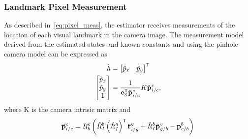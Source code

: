 \subsubsection{Landmark Pixel Measurement}
As described in~\eqref{eq:pixel_meas}, the estimator receives measurements of
the location of each visual landmark in the camera image. The measurement model
derived from the estimated states and known constants and using the pinhole
camera model can be expressed as
\begin{align}
  \hat{h} &=
  \begin{bmatrix}
    \hat{p}_x & \hat{p}_y
  \end{bmatrix}^{\mathsf{T}} \\
  \begin{bmatrix}
    \hat{p}_x \\ \hat{p}_y \\ 1
  \end{bmatrix} &= \frac{1}{\boldsymbol{\mathrm{e}}_3^{\mathsf{T}} \hat{\boldsymbol{\mathrm{p}}}_{i/c}^c} K
  \hat{\boldsymbol{\mathrm{p}}}_{i/c}^c,
\end{align}
where K is the camera intrisic matrix and 
\begin{align}
  \hat{\boldsymbol{\mathrm{p}}}_{i/c}^c = R_b^c \left( \hat{R}_I^b \left( \hat{R}_I^g \right)^{\mathsf{T}}
  \hat{\boldsymbol{\mathrm{r}}}_{i/g}^g + \hat{R}_I^b \hat{\boldsymbol{\mathrm{p}}}_{g/b}^v - \boldsymbol{\mathrm{p}}_{c/b}^b \right)
\end{align}


